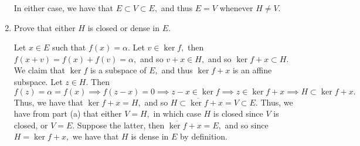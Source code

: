 \documentclass[11pt]{article}
\begin{document}
\begin{problem}
\begin{enumerate}
\begin{solution}
        In either case, we have that $E \subset V \subset E,$ and thus $E = V$ whenever $H \neq V.$
    \end{solution}
    \item Prove that either $H$ is closed or dense in $E.$
    \begin{solution}
        Let $x\in E$ such that $f(x) = \alpha.$ Let $v \in \ker f,$ then $f(x + v) = f(x) + f(v)= \alpha,$ and so $v + x \in H,$ and so $\ker f + x \subset H.$ We claim that $\ker f$ is a subspace of $E,$ and thus $\ker f + x$ is an affine subspace. Let $z \in H.$ Then \[f(z) = \alpha = f(x) \implies f(z - x) = 0 \implies z-x \in \ker f \implies z\in \ker f  + x \implies H\subset \ker f + x.\]
        Thus, we have that $\ker f + x = H,$ and so $H \subset \overline{\ker f} + x = V  \subset E.$ Thus, we have from part (a) that either $V = H,$ in which case $H$ is closed since $V$ is closed, or $V = E.$ Suppose the latter, then $\overline{\ker f} + x = E,$ and so since $H = \ker f  + x,$ we have that $H$ is dense in $E$ by definition.
    \end{solution}
\end{enumerate}
\end{problem}


\newpage
\end{document}
